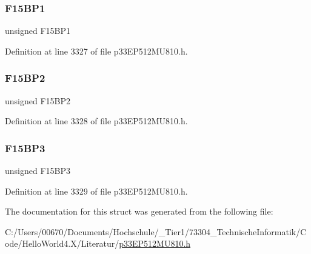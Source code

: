 \subsubsection{\texorpdfstring{F15\+B\+P1}{F15BP1}}
{\footnotesize\ttfamily unsigned F15\+B\+P1}



Definition at line 3327 of file p33\+E\+P512\+M\+U810.\+h.

\mbox{\label{structtag_c1_b_u_f_p_n_t4_b_i_t_s_ae990b3695ab0175cd7a80ffada713ec7}} 
\subsubsection{\texorpdfstring{F15\+B\+P2}{F15BP2}}
{\footnotesize\ttfamily unsigned F15\+B\+P2}



Definition at line 3328 of file p33\+E\+P512\+M\+U810.\+h.

\mbox{\label{structtag_c1_b_u_f_p_n_t4_b_i_t_s_a83963b21ba4820db13db6f7a67ed2398}} 
\subsubsection{\texorpdfstring{F15\+B\+P3}{F15BP3}}
{\footnotesize\ttfamily unsigned F15\+B\+P3}



Definition at line 3329 of file p33\+E\+P512\+M\+U810.\+h.



The documentation for this struct was generated from the following file\+:\begin{DoxyCompactItemize}
\item 
C\+:/\+Users/00670/\+Documents/\+Hochschule/\+\_\+\+Tier1/73304\+\_\+\+Technische\+Informatik/\+Code/\+Hello\+World4.\+X/\+Literatur/\hyperlink{p33_e_p512_m_u810_8h}{p33\+E\+P512\+M\+U810.\+h}\end{DoxyCompactItemize}
